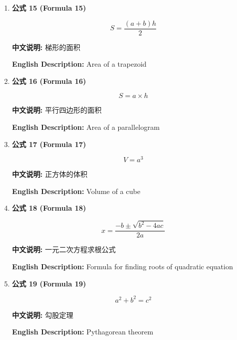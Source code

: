 \documentclass[12pt,a4paper]{article}
\begin{document}
\begin{enumerate}[leftmargin=*]
\item \textbf{公式 15 (Formula 15)}

\begin{equation}
S = \frac{(a + b)h}{2}
\end{equation}

\textbf{中文说明:} 梯形的面积

\textbf{English Description:} Area of a trapezoid

\vspace{0.5cm}

\item \textbf{公式 16 (Formula 16)}

\begin{equation}
S = a \times h
\end{equation}

\textbf{中文说明:} 平行四边形的面积

\textbf{English Description:} Area of a parallelogram

\vspace{0.5cm}

\item \textbf{公式 17 (Formula 17)}

\begin{equation}
V = a^3
\end{equation}

\textbf{中文说明:} 正方体的体积

\textbf{English Description:} Volume of a cube

\vspace{0.5cm}

\item \textbf{公式 18 (Formula 18)}

\begin{equation}
x = \frac{-b \pm \sqrt{b^2-4ac}}{2a}
\end{equation}

\textbf{中文说明:} 一元二次方程求根公式

\textbf{English Description:} Formula for finding roots of quadratic equation

\vspace{0.5cm}

\item \textbf{公式 19 (Formula 19)}

\begin{equation}
a^2 + b^2 = c^2
\end{equation}

\textbf{中文说明:} 勾股定理

\textbf{English Description:} Pythagorean theorem


\end{enumerate}
\end{document}

